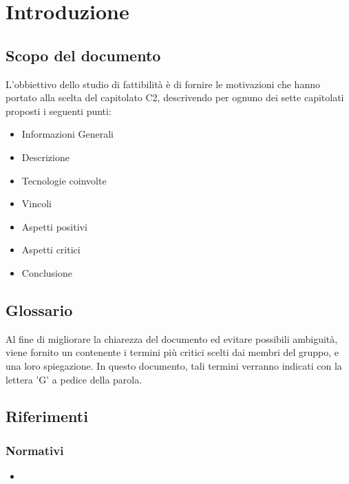 \section{Introduzione}

\subsection{Scopo del documento}
L'obbiettivo dello studio di fattibilità è di fornire le motivazioni che hanno portato alla scelta del capitolato C2, descrivendo per ognuno dei sette capitolati proposti i seguenti punti:
\begin{itemize}
\item Informazioni Generali
\item Descrizione
\item Tecnologie coinvolte
\item Vincoli
\item Aspetti positivi
\item Aspetti critici
\item Conclusione
\end{itemize}

\subsection{Glossario}
Al fine di migliorare la chiarezza del documento ed evitare possibili ambiguità, viene fornito un \Glossario{} contenente i termini più critici scelti dai membri del gruppo, e una loro spiegazione. In questo documento, tali termini verranno indicati con la lettera 'G' a pedice della parola. 

\subsection{Riferimenti}
\subsubsection{Normativi}
\begin{itemize}
\item {}
\end{itemize}

